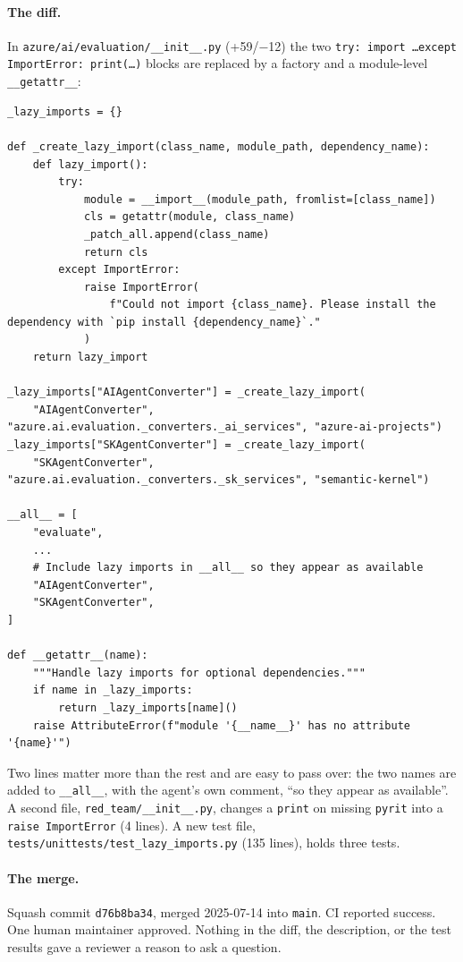 \documentclass[11pt,a4paper]{article}
\newcommand{\code}[1]{\texttt{#1}}
\begin{document}
\paragraph{The diff.} In \code{azure/ai/evaluation/\_\_init\_\_.py} (+59/$-$12) the two \code{try: import \ldots except ImportError: print(\ldots)} blocks are replaced by a factory and a module-level \code{\_\_getattr\_\_}:
\begin{lstlisting}
_lazy_imports = {}

def _create_lazy_import(class_name, module_path, dependency_name):
    def lazy_import():
        try:
            module = __import__(module_path, fromlist=[class_name])
            cls = getattr(module, class_name)
            _patch_all.append(class_name)
            return cls
        except ImportError:
            raise ImportError(
                f"Could not import {class_name}. Please install the dependency with `pip install {dependency_name}`."
            )
    return lazy_import

_lazy_imports["AIAgentConverter"] = _create_lazy_import(
    "AIAgentConverter", "azure.ai.evaluation._converters._ai_services", "azure-ai-projects")
_lazy_imports["SKAgentConverter"] = _create_lazy_import(
    "SKAgentConverter", "azure.ai.evaluation._converters._sk_services", "semantic-kernel")

__all__ = [
    "evaluate",
    ...
    # Include lazy imports in __all__ so they appear as available
    "AIAgentConverter",
    "SKAgentConverter",
]

def __getattr__(name):
    """Handle lazy imports for optional dependencies."""
    if name in _lazy_imports:
        return _lazy_imports[name]()
    raise AttributeError(f"module '{__name__}' has no attribute '{name}'")
\end{lstlisting}
Two lines matter more than the rest and are easy to pass over: the two names are added to \code{\_\_all\_\_}, with the agent's own comment, ``so they appear as available''. A second file, \code{red\_team/\_\_init\_\_.py}, changes a \code{print} on missing \code{pyrit} into a \code{raise ImportError} (4 lines). A new test file, \code{tests/unittests/test\_lazy\_imports.py} (135 lines), holds three tests.

\paragraph{The merge.} Squash commit \code{d76b8ba34}, merged 2025-07-14 into \code{main}. CI reported success. One human maintainer approved. Nothing in the diff, the description, or the test results gave a reviewer a reason to ask a question.
\end{document}
